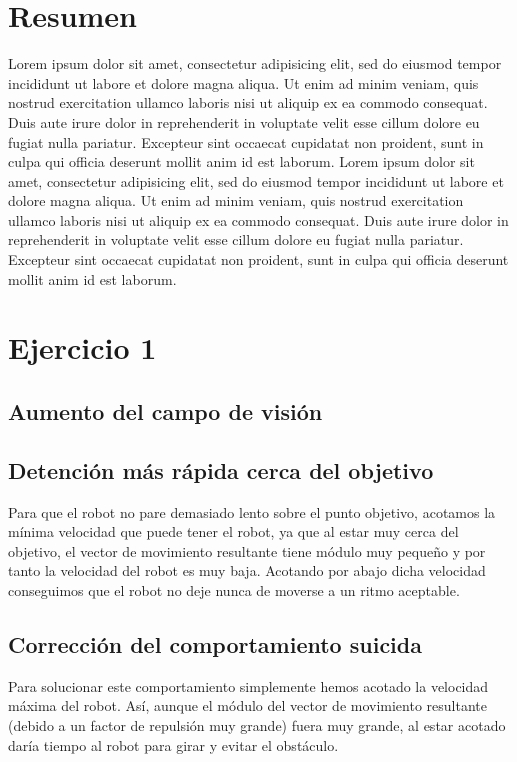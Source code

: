\documentclass[a4paper, 11pt, titlepage]{article}
\begin{document}
  \maketitle
  \tableofcontents
  \newpage

  \section{Resumen}
  Lorem ipsum dolor sit amet, consectetur adipisicing elit, sed do eiusmod tempor incididunt ut labore et dolore magna aliqua. Ut enim ad minim veniam, quis nostrud exercitation ullamco laboris nisi ut aliquip ex ea commodo consequat. Duis aute irure dolor in reprehenderit in voluptate velit esse cillum dolore eu fugiat nulla pariatur. Excepteur sint occaecat cupidatat non proident, sunt in culpa qui officia deserunt mollit anim id est laborum.
  Lorem ipsum dolor sit amet, consectetur adipisicing elit, sed do eiusmod tempor incididunt ut labore et dolore magna aliqua. Ut enim ad minim veniam, quis nostrud exercitation ullamco laboris nisi ut aliquip ex ea commodo consequat. Duis aute irure dolor in reprehenderit in voluptate velit esse cillum dolore eu fugiat nulla pariatur. Excepteur sint occaecat cupidatat non proident, sunt in culpa qui officia deserunt mollit anim id est laborum.

  \section{Ejercicio 1}

  \subsection{Aumento del campo de visión}

  \subsection{Detención más rápida cerca del objetivo}
    Para que el robot no pare demasiado lento sobre el punto objetivo, acotamos la mínima velocidad que puede tener el robot, ya que al estar muy cerca del objetivo, el vector de movimiento resultante tiene módulo muy pequeño y por tanto la velocidad del robot es muy baja. Acotando por abajo dicha velocidad conseguimos que el robot no deje nunca de moverse a un ritmo aceptable.

  \subsection{Corrección del comportamiento suicida}
    Para solucionar este comportamiento simplemente hemos acotado la velocidad máxima del robot. Así, aunque el módulo del vector de movimiento resultante (debido a un factor de repulsión muy grande) fuera muy grande, al estar acotado daría tiempo al robot para girar y evitar el obstáculo.
\end{document}
